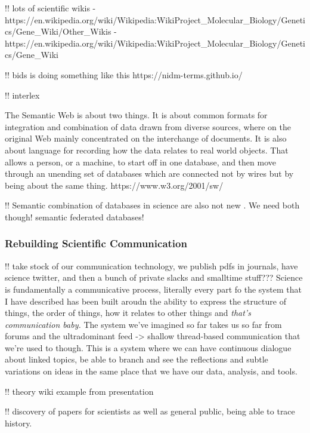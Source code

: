 \documentclass[10pt]{article}
\begin{document}
\begin{multicols}{2}
!! lots of scientific wikis -
https://en.wikipedia.org/wiki/Wikipedia:WikiProject\_Molecular\_Biology/Genetics/Gene\_Wiki/Other\_Wikis
-
https://en.wikipedia.org/wiki/Wikipedia:WikiProject\_Molecular\_Biology/Genetics/Gene\_Wiki

!! bids is doing something like this https://nidm-terms.github.io/

!! interlex

\begin{leftbar}
The Semantic Web is about two things. It is about common formats for
integration and combination of data drawn from diverse sources, where on
the original Web mainly concentrated on the interchange of documents. It
is also about language for recording how the data relates to real world
objects. That allows a person, or a machine, to start off in one
database, and then move through an unending set of databases which are
connected not by wires but by being about the same thing.
https://www.w3.org/2001/sw/
\end{leftbar}

!! Semantic combination of databases in science are also not new \cite{cheungSemanticWebApproach2007, simaEnablingSemanticQueries2019} .
We need both though! semantic federated databases!

\hypertarget{rebuilding-scientific-communication}{%
\subsubsection{Rebuilding Scientific
Communication}\label{rebuilding-scientific-communication}}

!! take stock of our communication technology, we publish pdfs in
journals, have science twitter, and then a bunch of private slacks and
smalltime stuff??? Science is fundamentally a communicative process,
literally every part fo the system that I have described has been built
aroudn the ability to express the structure of things, the order of
things, how it relates to other things and \emph{that's communication
baby.} The system we've imagined so far takes us so far from forums and
the ultradominant feed -\textgreater{} shallow thread-based
communication that we're used to though. This is a system where we can
have continuous dialogue about linked topics, be able to branch and see
the reflections and subtle variations on ideas in the same place that we
have our data, analysis, and tools.

!! theory wiki example from presentation

!! discovery of papers for scientists as well as general public, being
able to trace history.


\end{multicols}
\end{document}
